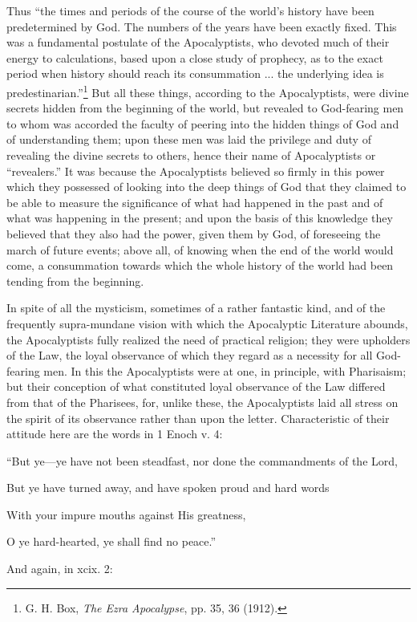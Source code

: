 Thus “the times and periods of the course of the
world’s history have been predetermined by God.
The numbers of the years have been exactly fixed.
This was a fundamental postulate of the Apocalyptists,
who devoted much of their energy to calculations,
based upon a close study of prophecy, as to the exact
period when history should reach its consummation ...
the underlying idea is predestinarian.”\footnote{G. H. Box, \emph{The Ezra Apocalypse}, pp. 35, 36 (1912).} But
all these things, according to the Apocalyptists, were
divine secrets hidden from the beginning of the world,
but revealed to God-fearing men to whom was
accorded the faculty of peering into the hidden things
of God and of understanding them; upon these men
was laid the privilege and duty of revealing the divine
secrets to others, hence their name of Apocalyptists
or “revealers.” It was because the Apocalyptists
believed so firmly in this power which they possessed
of looking into the deep things of God that they
claimed to be able to measure the significance of
what had happened in the past and of what was
happening in the present; and upon the basis of this
knowledge they believed that they also had the
power, given them by God, of foreseeing the march of
future events; above all, of knowing when the end
of the world would come, a consummation towards
which the whole history of the world had been tending
from the beginning.

In spite of all the mysticism, sometimes of a rather
fantastic kind, and of the frequently supra-mundane
vision with which the Apocalyptic Literature abounds,
the Apocalyptists fully realized the need of practical
religion; they were upholders of the Law, the loyal
observance of which they regard as a necessity for
all God-fearing men. In this the Apocalyptists were
at one, in principle, with Pharisaism; but their
conception of what constituted loyal observance of
the Law differed from that of the Pharisees, for,
unlike these, the Apocalyptists laid all stress on the
spirit of its observance rather than upon the letter.
Characteristic of their attitude here are the words
in 1 Enoch v. 4:

“But ye—ye have not been steadfast, nor done the commandments of the Lord,

But ye have turned away, and have spoken proud and hard words

With your impure mouths against His greatness,

O ye hard-hearted, ye shall find no peace.”

And again, in xcix. 2:

